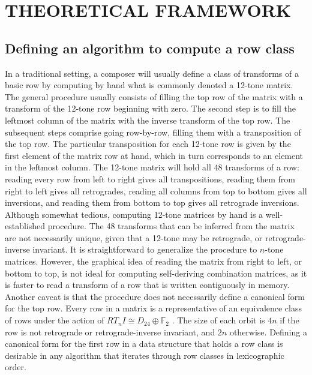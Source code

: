 \chapter{THEORETICAL FRAMEWORK}


\section{Defining an algorithm to compute a row class}

In a traditional setting, a composer will usually define a class of transforms of a basic row by computing by hand what is commonly denoted a 12-tone matrix. The general procedure usually consists of filling the top row of the matrix with a transform of the 12-tone row beginning with zero. The second step is to fill the leftmost column of the matrix with the inverse transform of the top row. The subsequent steps comprise going row-by-row, filling them with a transposition of the top row. The particular transposition for each 12-tone row is given by the first element of the matrix row at hand, which in turn corresponds to an element in the leftmost column. The 12-tone matrix will hold all 48 transforms of a row: reading every row from left to right gives all transpositions, reading them from right to left gives all retrogrades, reading all columns from top to bottom gives all inversions, and reading them from bottom to top gives all retrograde inversions. Although somewhat tedious, computing 12-tone matrices by hand is a well-established procedure. The 48 transforms that can be inferred from the matrix are not necessarily unique, given that a 12-tone may be retrograde, or retrograde-inverse invariant. It is straightforward to generalize the procedure to $n$-tone matrices. However, the graphical idea of reading the matrix from right to left, or bottom to top, is not ideal for computing self-deriving combination matrices, as it is faster to read a transform of a row that is written contiguously in memory. Another caveat is that the procedure does not necessarily define a canonical form for the top row. Every row in a matrix is a representative of an equivalence class of rows under the action of $RT_nI \cong D_{24} \oplus \mathbb{F}_2$ \cite[127]{FripertingerLackner2015}. The size of each orbit is $4n$ if the row is not retrograde or retrograde-inverse invariant, and $2n$ otherwise. Defining a canonical form for the first row in a data structure that holds a row class is desirable in any algorithm that iterates through row classes in lexicographic order.

